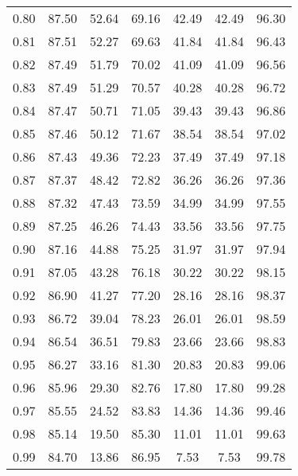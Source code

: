 \begin{tabular}{|c|c|c|c|c|c|c|}
      0.80 &     87.50 &     52.64 &      69.16 &   42.49 &      42.49 &         96.30 \\
      0.81 &     87.51 &     52.27 &      69.63 &   41.84 &      41.84 &         96.43 \\
      0.82 &     87.49 &     51.79 &      70.02 &   41.09 &      41.09 &         96.56 \\
      0.83 &     87.49 &     51.29 &      70.57 &   40.28 &      40.28 &         96.72 \\
      0.84 &     87.47 &     50.71 &      71.05 &   39.43 &      39.43 &         96.86 \\
      0.85 &     87.46 &     50.12 &      71.67 &   38.54 &      38.54 &         97.02 \\
      0.86 &     87.43 &     49.36 &      72.23 &   37.49 &      37.49 &         97.18 \\
      0.87 &     87.37 &     48.42 &      72.82 &   36.26 &      36.26 &         97.36 \\
      0.88 &     87.32 &     47.43 &      73.59 &   34.99 &      34.99 &         97.55 \\
      0.89 &     87.25 &     46.26 &      74.43 &   33.56 &      33.56 &         97.75 \\
      0.90 &     87.16 &     44.88 &      75.25 &   31.97 &      31.97 &         97.94 \\
      0.91 &     87.05 &     43.28 &      76.18 &   30.22 &      30.22 &         98.15 \\
      0.92 &     86.90 &     41.27 &      77.20 &   28.16 &      28.16 &         98.37 \\
      0.93 &     86.72 &     39.04 &      78.23 &   26.01 &      26.01 &         98.59 \\
      0.94 &     86.54 &     36.51 &      79.83 &   23.66 &      23.66 &         98.83 \\
      0.95 &     86.27 &     33.16 &      81.30 &   20.83 &      20.83 &         99.06 \\
      0.96 &     85.96 &     29.30 &      82.76 &   17.80 &      17.80 &         99.28 \\
      0.97 &     85.55 &     24.52 &      83.83 &   14.36 &      14.36 &         99.46 \\
      0.98 &     85.14 &     19.50 &      85.30 &   11.01 &      11.01 &         99.63 \\
      0.99 &     84.70 &     13.86 &      86.95 &    7.53 &       7.53 &         99.78 \\
\bottomrule
\end{tabular}
